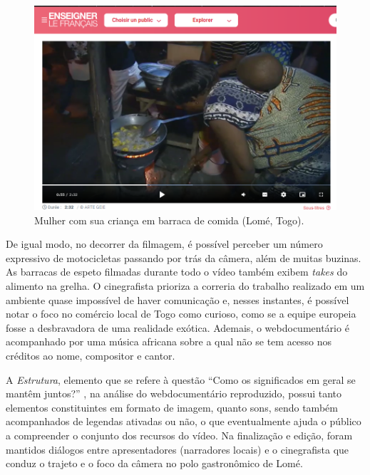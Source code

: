 \documentclass[portuguese]{textolivre}
\begin{document}
\begin{figure}
    \centering
    \begin{minipage}{.75\textwidth}
    \includegraphics[width=\linewidth]{Fig7.png}
    \caption{Mulher com sua criança em barraca de comida (Lomé, Togo).}
    \label{fig7}
    \end{minipage}
\end{figure}

De igual modo, no decorrer da filmagem, é possível perceber um número expressivo de motocicletas passando por trás da câmera, além de muitas buzinas. As barracas de espeto filmadas durante todo o vídeo também exibem \textit{takes} do alimento na grelha. O cinegrafista prioriza a correria do trabalho realizado em um ambiente quase impossível de haver comunicação e, nesses instantes, é possível notar o foco no comércio local de Togo como curioso, como se a equipe europeia fosse a desbravadora de uma realidade exótica. Ademais, o webdocumentário é acompanhado por uma música africana sobre a qual não se tem acesso nos créditos ao nome, compositor e cantor.

A \emph{Estrutura}, elemento que se refere à questão “Como os significados em geral se mantêm juntos?” \cite[p. 293]{kalantzis_letramentos_2020}, na análise do webdocumentário reproduzido, possui tanto elementos constituintes em formato de imagem, quanto sons, sendo também acompanhados de legendas ativadas ou não, o que eventualmente ajuda o público a compreender o conjunto dos recursos do vídeo. Na finalização e edição, foram mantidos diálogos entre apresentadores (narradores locais) e o cinegrafista que conduz o trajeto e o foco da câmera no polo gastronômico de  Lomé. 
\end{document}
